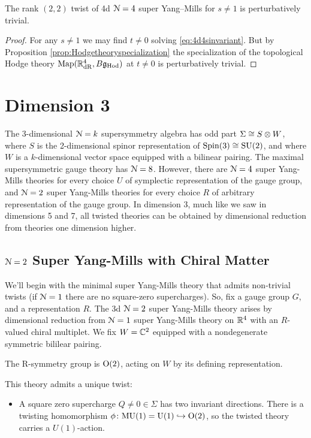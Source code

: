 \documentclass[10pt, oneside]{article}
\newcommand{\Hod}{\mathrm{Hod}}
\newcommand{\MU}{\mathrm{MU}}
\renewcommand{\U}{\mathrm{U}}
\begin{document}
\begin{cor}
The rank $(2, 2)$ twist of 4d $\mathcal N=4$ super Yang--Mills for $s\neq 1$ is perturbatively trivial.
\end{cor}
\begin{proof}
For any $s\neq 1$ we may find $t\neq 0$ solving \eqref{eq:4d4sinvariant}. But by Proposition \ref{prop:Hodgetheoryspecialization} the specialization of the topological Hodge theory $\map(\RR^4_{\mathrm{dR}}, B\fg_{\Hod})$ at $t\neq 0$ is perturbatively trivial.
\end{proof}

\section{Dimension 3}
The 3-dimensional $\mathcal{N}=k$ supersymmetry algebra has odd part $\Sigma \cong S \otimes W$, where $S$ is the 2-dimensional spinor representation of $\mathrm{Spin}(3) \cong \mathrm{SU}(2)$, and where $W$ is a $k$-dimensional vector space equipped with a bilinear pairing.  The maximal supersymmetric gauge theory has $\mathcal{N}=8$.  However, there are $\mathcal{N}=4$ super Yang-Mills theories for every choice $U$ of symplectic representation of the gauge group, and $\mathcal{N}=2$ super Yang-Mills theories for every choice $R$ of arbitrary representation of the gauge group.  In dimension 3, much like we saw in dimensions 5 and 7, all twisted theories can be obtained by dimensional reduction from theories one dimension higher.

\subsection{\texorpdfstring{$\mathcal N = 2$}{N=2} Super Yang-Mills with Chiral Matter} 
\label{sect:3d_2_section}
We'll begin with the minimal super Yang-Mills theory that admits non-trivial twists (if $\mathcal{N}=1$ there are no square-zero supercharges).  So, fix a gauge group $G$, and a representation $R$.  The 3d $\mathcal{N}=2$ super Yang-Mills theory arises by dimensional reduction from $\mathcal{N}=1$ super Yang-Mills theory on $\mathbb R^4$ with an $R$-valued chiral multiplet.  We fix $W = \mathbb C^2$ equipped with a nondegenerate symmetric bililear pairing.

The R-symmetry group is $\mathrm{O}(2)$, acting on $W$ by its defining representation.  

This theory admits a unique twist:
\begin{itemize}
 \item A square zero supercharge $Q \ne 0 \in \Sigma$ has two invariant directions.  There is a twisting homomorphism $\phi \colon \MU(1) = \U(1)\hookrightarrow \mr O(2)$, so the twisted theory carries a $U(1)$-action.
\end{itemize}
\end{document}
